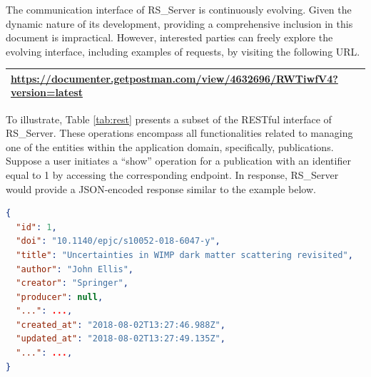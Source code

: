 \documentclass[a4paper, english]{article}
\newcommand{\rsserver}{RS\_Server\xspace}
\begin{document}
The communication interface of \rsserver is continuously evolving. Given the dynamic nature of its development, providing a comprehensive inclusion in this document is impractical. However, interested parties can freely explore the evolving interface, including examples of requests, by visiting the following URL.

\begin{table}[h]
\centering
\begin{tabular}{p{12cm}}
  \toprule
	\url{https://documenter.getpostman.com/view/4632696/RWTiwfV4?version=latest}  \\
 \toprule
  \end{tabular}
\end{table}

To illustrate, Table \ref{tab:rest} presents a subset of the RESTful interface of \rsserver. These operations encompass all functionalities related to managing one of the entities within the application domain, specifically, publications. Suppose a user initiates a ``show'' operation for a publication with an identifier equal to 1 by accessing the corresponding endpoint. In response, \rsserver would provide a JSON-encoded response similar to the example below.

\begin{lstlisting}[language=json,firstnumber=1]
{
  "id": 1,
  "doi": "10.1140/epjc/s10052-018-6047-y",
  "title": "Uncertainties in WIMP dark matter scattering revisited",
  "author": "John Ellis",
  "creator": "Springer",
  "producer": null,
  "...": ...,
  "created_at": "2018-08-02T13:27:46.988Z",
  "updated_at": "2018-08-02T13:27:49.135Z",
  "...": ...,
}
\end{lstlisting}
\end{document}
